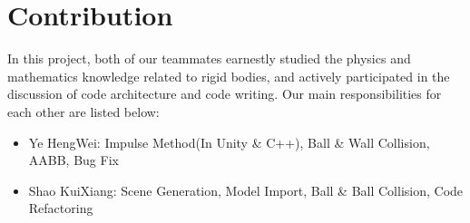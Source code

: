 \documentclass[acmtog]{acmart}
\begin{document}
\section{Contribution}
In this project, both of our teammates earnestly studied the physics and mathematics knowledge related to rigid bodies, and actively participated in the discussion of code architecture and code writing. Our main responsibilities for each other are listed below:
\begin{itemize}
	\item Ye HengWei: Impulse Method(In Unity & C++), Ball & Wall Collision, AABB, Bug Fix
	\item Shao KuiXiang: Scene Generation, Model Import, Ball & Ball Collision, Code Refactoring
\end{itemize}
\end{document}
